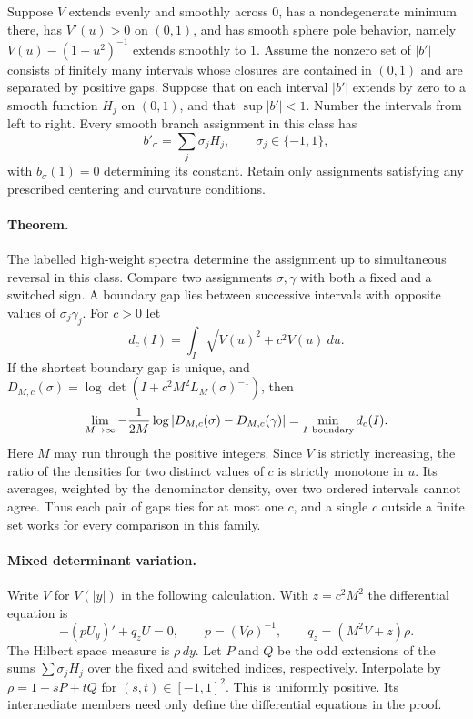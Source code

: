 \documentclass[11pt,letterpaper]{article}
\begin{document}
Suppose $V$ extends evenly and smoothly across $0$, has a nondegenerate minimum there, has $V'(u)>0$ on $(0,1)$, and has smooth sphere pole behavior, namely $V(u)-(1-u^2)^{-1}$ extends smoothly to $1$. Assume the nonzero set of $|b'|$ consists of finitely many intervals whose closures are contained in $(0,1)$ and are separated by positive gaps. Suppose that on each interval $|b'|$ extends by zero to a smooth function $H_j$ on $(0,1)$, and that $\sup |b'|<1$. Number the intervals from left to right. Every smooth branch assignment in this class has
\[
 b'_\sigma=\sum_j \sigma_j H_j,\qquad \sigma_j\in\{-1,1\},
\]
with $b_\sigma(1)=0$ determining its constant. Retain only assignments satisfying any prescribed centering and curvature conditions.

\paragraph{Theorem.}
The labelled high-weight spectra determine the assignment up to simultaneous reversal in this class. Compare two assignments $\sigma,\gamma$ with both a fixed and a switched sign. A boundary gap lies between successive intervals with opposite values of $\sigma_j\gamma_j$. For $c>0$ let
\[
 d_c(I)=\int_I \sqrt{V(u)^2+c^2V(u)}\,du.
\]
If the shortest boundary gap is unique, and $D_{M,c}(\sigma)=\log\det(I+c^2M^2 L_M(\sigma)^{-1})$, then
\[
 \lim_{M\to\infty}-\frac{1}{2M}
 \log |D_{M,c}(\sigma)-D_{M,c}(\gamma)|
 =\min_{I\ {\rm boundary}} d_c(I).
\]
Here $M$ may run through the positive integers. Since $V$ is strictly increasing, the ratio of the densities for two distinct values of $c$ is strictly monotone in $u$. Its averages, weighted by the denominator density, over two ordered intervals cannot agree. Thus each pair of gaps ties for at most one $c$, and a single $c$ outside a finite set works for every comparison in this family.

\paragraph{Mixed determinant variation.}
Write $V$ for $V(|y|)$ in the following calculation. With $z=c^2M^2$ the differential equation is
\[
 -(pU_y)' + q_zU=0,\qquad
 p=(V\rho)^{-1},\qquad q_z=(M^2V+z)\rho .
\]
The Hilbert space measure is $\rho\,dy$. Let $P$ and $Q$ be the odd extensions of the sums $\sum \sigma_j H_j$ over the fixed and switched indices, respectively. Interpolate by $\rho=1+sP+tQ$ for $(s,t)\in[-1,1]^2$. This is uniformly positive. Its intermediate members need only define the differential equations in the proof.
\end{document}
